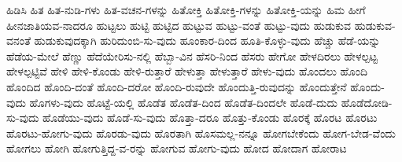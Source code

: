 {ಹಿಡಿಸಿ
ಹಿತ
ಹಿತ-ನುಡಿ-ಗಳು
ಹಿತ-ವಚನ-ಗಳನ್ನು
ಹಿತೋಕ್ತಿ
ಹಿತೋಕ್ತಿ-ಗಳನ್ನು
ಹಿತೋಕ್ತಿ-ಯನ್ನು
ಹಿಮ
ಹೀಗೆ
ಹೀನಜಾತಿಯವ-ನಾದರೂ
ಹುಟ್ಟಲು
ಹುಟ್ಟಿ
ಹುಟ್ಟಿದ
ಹುಟ್ಟುವ
ಹುಟ್ಟು-ವಂತೆ
ಹುಟ್ಟು-ವುದು
ಹುಡುಕುವ
ಹುಡುಕುವ-ವನಂತೆ
ಹುಡುಕುವುದಕ್ಕಾಗಿ
ಹುರಿದುಂಬಿ-ಸು-ವುದು
ಹೂಂಕಾರ-ದಿಂದ
ಹೂತಿ-ಕೊಳ್ಳು-ವುದು
ಹೆಚ್ಚು
ಹೆಡೆ-ಯನ್ನು
ಹೆಡೆಯ-ಮೇಲೆ
ಹೆಣ್ಣು
ಹೆದೆಯೇರಿಸು-ನಲ್ಲಿ
ಹೆಬ್ಬಾ-ವಿನ
ಹೆಸರಿ-ನಿಂದ
ಹೆಸರು
ಹೇಗೋ
ಹೇಳದಿರಲು
ಹೇಳಲ್ಪಟ್ಟ
ಹೇಳಲ್ಪಟ್ಟಿವೆ
ಹೇಳಿ
ಹೇಳಿ-ಕೊಂಡು
ಹೇಳಿ-ರುತ್ತಾರೆ
ಹೇಳುತ್ತಾ
ಹೇಳುತ್ತಾರೆ
ಹೇಳು-ವುದು
ಹೊಂದಲು
ಹೊಂದಿ
ಹೊಂದಿದ
ಹೊಂದಿ-ದಂತೆ
ಹೊಂದಿ-ದರೋ
ಹೊಂದಿ-ರುವುದೇ
ಹೊಂದುತ್ತಿ-ರುವುದನ್ನು
ಹೊಂದುತ್ತೇನೆ
ಹೊಂದು-ವುದು
ಹೊಗಳು-ವುದು
ಹೊಟ್ಟೆ-ಯಲ್ಲಿ
ಹೊಡೆತ
ಹೊಡೆತ-ದಿಂದ
ಹೊಡೆತ-ದಿಂದಲೇ
ಹೊಡೆ-ದುದು
ಹೊಡೆದೋಡಿ-ಸು-ವುದು
ಹೊಡೆಯು-ವುದು
ಹೊಡೆ-ಸು-ವುದು
ಹೊತ್ತಾ-ದರೂ
ಹೊತ್ತು-ಕೊಂಡು
ಹೊರಕ್ಕೆ
ಹೊರಟ
ಹೊರಟು
ಹೊರಟು-ಹೋಗು-ವುದು
ಹೊರಡು-ವುದು
ಹೊರತಾಗಿ
ಹೊಸಮಲ್ಲ-ನನ್ನೂ
ಹೋಗಬೇಕೆಂದು
ಹೋಗ-ಬೇಡ-ವೆಂದು
ಹೋಗಲು
ಹೋಗಿ
ಹೋಗುತ್ತಿದ್ದ-ವ-ರನ್ನು
ಹೋಗುವ
ಹೋಗು-ವುದು
ಹೋದ
ಹೋದಾಗ
ಹೋರಾಟ
}
